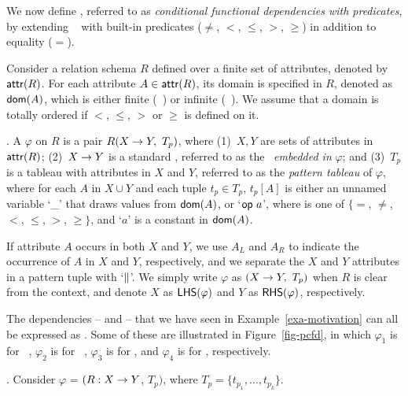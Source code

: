 We now define \pCFDs, referred to
as {\em conditional functional dependencies with predicates},
by extending \CFDs~\cite{CFDs} with built-in
predicates ($\ne$, $<$, $\le$, $>$, $\ge$) in addition to equality ($=$).

Consider a relation schema $R$ defined over a finite set of
attributes, denoted by $\protect\mathsf{attr}(R)$. For each attribute $A \in
\protect\mathsf{attr}(R)$, its domain is specified in $R$, denoted as $\protect\mathsf{dom}(A)$,
which is either finite (\eg~)
or infinite (\eg~).
We assume \kwlog that a domain is totally ordered if
$<$, $\le$, $>$ or $\ge$ is defined on it.


. A \pCFD $\varphi$ on $R$ is a pair
$R(X\rightarrow Y,\ T_p)$, where (1)~$X, Y$ are sets of attributes in
$\protect\mathsf{attr}(R)$; (2)~$X \rightarrow Y$ is a standard \FD, referred to as the
\FD~{\em embedded in} $\varphi$; and (3)~$T_p$ is a tableau with
attributes in $X$ and $Y$, referred to as the {\em pattern tableau}
of $\varphi$, where for each $A$ in $X \cup Y$ and each tuple $t_p
\in T_p$, $t_p[A]$ is either an unnamed
variable `\_' that draws values from $\protect\mathsf{dom}(A)$, or
`$\op a$', where \op is one of $\{=$, $\ne$,
$<$, $\le$, $>$, $\ge\}$,  and `$a$' is a constant in $\protect\mathsf{dom}(A)$.

If attribute $A$
occurs in both $X$ and $Y$, we use $A_L$ and $A_R$ to indicate the
occurrence of $A$ in $X$ and $Y$, respectively, and we separate the $X$
and $Y$ attributes in a pattern tuple with `$\parallel$'.
We simply write $\varphi$ as $(X \rightarrow Y,\ T_p)$ when $R$ is clear from the
context, and denote $X$ as $\relax{{\ensuremath {\mathsf{LHS}}}}(\varphi)$ and $Y$ as
$\relax{{\ensuremath {\mathsf{RHS}}}}(\varphi)$, respectively.



\begin{example}
The dependencies -- and --
that we have seen in Example~\ref{exa-motivation} can all be expressed as \pCFDs.  Some of these \pCFDs
are illustrated in Figure~\ref{fig-pcfd}, in which $\varphi_1$ is for \FD\ ,
$\varphi_2$ is for \CFD\ , $\varphi_3$ is for ,
and $\varphi_4$ is for , respectively.
\end{example}
\vspace{-1ex}


. Consider \pCFD $\varphi$ =
$(R:X\rightarrow Y$, $T_p)$, where $T_p = \{t_{p_1}, \ldots, t_{p_k}\}$.

